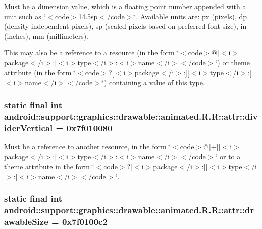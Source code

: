 Must be a dimension value, which is a floating point number appended with a unit such as \char`\"{}$<$code$>$14.5sp$<$/code$>$\char`\"{}. Available units are: px (pixels), dp (density-independent pixels), sp (scaled pixels based on preferred font size), in (inches), mm (millimeters). 

This may also be a reference to a resource (in the form \char`\"{}$<$code$>$@\mbox{[}$<$i$>$package$<$/i$>$:\mbox{]}$<$i$>$type$<$/i$>$:$<$i$>$name$<$/i$>$$<$/code$>$\char`\"{}) or theme attribute (in the form \char`\"{}$<$code$>$?\mbox{[}$<$i$>$package$<$/i$>$:\mbox{]}\mbox{[}$<$i$>$type$<$/i$>$:\mbox{]}$<$i$>$name$<$/i$>$$<$/code$>$\char`\"{}) containing a value of this type. \hypertarget{classandroid_1_1support_1_1graphics_1_1drawable_1_1animated_1_1_r_1_1attr_b95f123f2624010a2af40db393c872a0}{
\subsubsection[{dividerVertical}]{\setlength{\rightskip}{0pt plus 5cm}static final int android::support::graphics::drawable::animated.R.R::attr::dividerVertical = 0x7f010080}}
\label{classandroid_1_1support_1_1graphics_1_1drawable_1_1animated_1_1_r_1_1attr_b95f123f2624010a2af40db393c872a0}


Must be a reference to another resource, in the form \char`\"{}$<$code$>$@\mbox{[}+\mbox{]}\mbox{[}$<$i$>$package$<$/i$>$:\mbox{]}$<$i$>$type$<$/i$>$:$<$i$>$name$<$/i$>$$<$/code$>$\char`\"{} or to a theme attribute in the form \char`\"{}$<$code$>$?\mbox{[}$<$i$>$package$<$/i$>$:\mbox{]}\mbox{[}$<$i$>$type$<$/i$>$:\mbox{]}$<$i$>$name$<$/i$>$$<$/code$>$\char`\"{}. \hypertarget{classandroid_1_1support_1_1graphics_1_1drawable_1_1animated_1_1_r_1_1attr_4119ab1eee81b67b5d5a16f2e6a1efe2}{
\subsubsection[{drawableSize}]{\setlength{\rightskip}{0pt plus 5cm}static final int android::support::graphics::drawable::animated.R.R::attr::drawableSize = 0x7f0100c2}}
\label{classandroid_1_1support_1_1graphics_1_1drawable_1_1animated_1_1_r_1_1attr_4119ab1eee81b67b5d5a16f2e6a1efe2}


